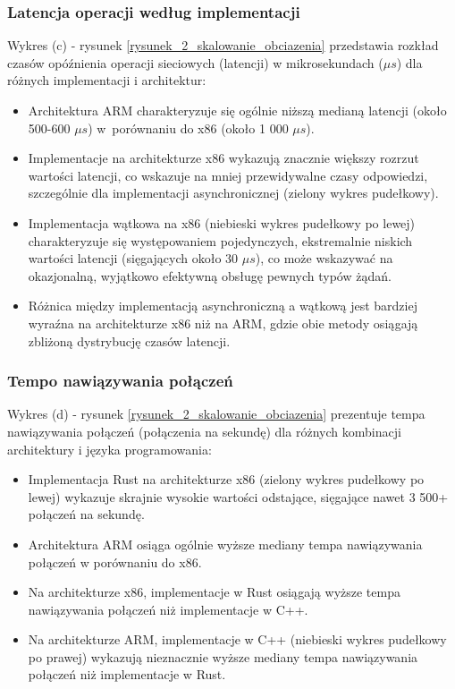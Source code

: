 \subsubsection{Latencja operacji według implementacji}
Wykres (c) - rysunek \ref{rysunek_2_skalowanie_obciazenia} przedstawia rozkład czasów opóźnienia operacji sieciowych (latencji) w mikrosekundach ($\mu s$) dla różnych implementacji i architektur:
\begin{itemize}
    \item Architektura ARM charakteryzuje się ogólnie niższą medianą latencji (około 500-600 $\mu s$) w~porównaniu do x86 (około 1 000 $\mu s$).
    \item Implementacje na architekturze x86 wykazują znacznie większy rozrzut wartości latencji, co wskazuje na mniej przewidywalne czasy odpowiedzi, szczególnie dla implementacji asynchronicznej (zielony wykres pudełkowy).
    \item Implementacja wątkowa na x86 (niebieski wykres pudełkowy po lewej) charakteryzuje się występowaniem pojedynczych, ekstremalnie niskich wartości latencji (sięgających około 30 $\mu s$), co może wskazywać na okazjonalną, wyjątkowo efektywną obsługę pewnych typów żądań.
    \item Różnica między implementacją asynchroniczną a wątkową jest bardziej wyraźna na architekturze x86 niż na ARM, gdzie obie metody osiągają zbliżoną dystrybucję czasów latencji.
\end{itemize}

\subsubsection{Tempo nawiązywania połączeń}
Wykres (d) - rysunek \ref{rysunek_2_skalowanie_obciazenia} prezentuje tempa nawiązywania połączeń (połączenia na sekundę) dla różnych kombinacji architektury i języka programowania:
\begin{itemize}
    \item Implementacja Rust na architekturze x86 (zielony wykres pudełkowy po lewej) wykazuje skrajnie wysokie wartości odstające, sięgające nawet 3 500+ połączeń na sekundę.
    \item Architektura ARM osiąga ogólnie wyższe mediany tempa nawiązywania połączeń w porównaniu do x86.
    \item Na architekturze x86, implementacje w Rust osiągają wyższe tempa nawiązywania połączeń niż implementacje w C++.
    \item Na architekturze ARM, implementacje w C++ (niebieski wykres pudełkowy po prawej) wykazują nieznacznie wyższe mediany tempa nawiązywania połączeń niż implementacje w Rust.
\end{itemize}

